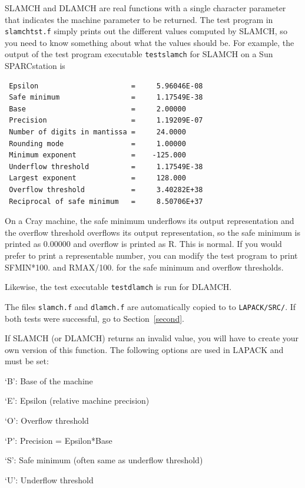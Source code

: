 \documentclass[11pt]{report}
\begin{document}
SLAMCH and DLAMCH are real functions with a single character parameter
that indicates the machine parameter to be returned.  The test 
program in \texttt{slamchtst.f}
simply prints out the different values computed by SLAMCH,
so you need to know something about what the values should be. 
For example, the output of the test program executable \texttt{testslamch}
for SLAMCH on a Sun SPARCstation is
\begin{verbatim}
 Epsilon                      =     5.96046E-08
 Safe minimum                 =     1.17549E-38
 Base                         =     2.00000
 Precision                    =     1.19209E-07
 Number of digits in mantissa =     24.0000
 Rounding mode                =     1.00000
 Minimum exponent             =    -125.000
 Underflow threshold          =     1.17549E-38
 Largest exponent             =     128.000
 Overflow threshold           =     3.40282E+38
 Reciprocal of safe minimum   =     8.50706E+37
\end{verbatim}
On a Cray machine, the safe minimum underflows its output
representation and the overflow threshold overflows its output
representation, so the safe minimum is printed as 0.00000 and overflow
is printed as R.  This is normal.
If you would prefer to print a representable number, you can modify
the test program to print SFMIN*100. and RMAX/100. for the safe
minimum and overflow thresholds.

Likewise, the test executable \texttt{testdlamch} is run for DLAMCH.

The files \texttt{slamch.f} and \texttt{dlamch.f} are automatically copied to
to \texttt{LAPACK/SRC/}.
If both tests were successful, go to Section~\ref{second}.

If SLAMCH (or DLAMCH) returns an invalid value, you will have to create
your own version of this function.  The following options are used in
LAPACK and must be set:

\begin{list}{}{}
\item {`B': }  Base of the machine
\item {`E': }  Epsilon (relative machine precision)
\item {`O': }  Overflow threshold
\item {`P': }  Precision = Epsilon*Base
\item {`S': }  Safe minimum (often same as underflow threshold)
\item {`U': }  Underflow threshold
\end{list}
\end{document}
